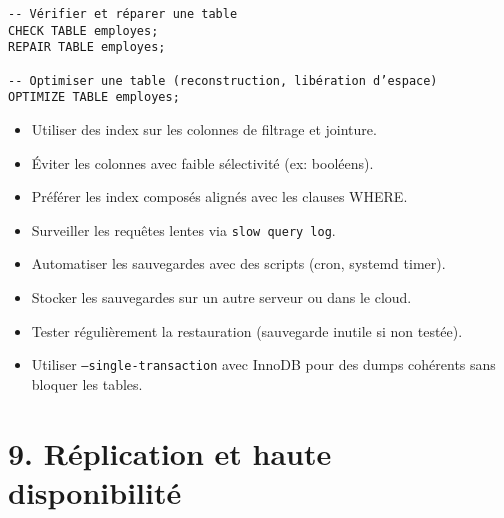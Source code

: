 \documentclass[a4paper,11pt]{article}
\begin{document}
\begin{tcolorbox}[colback=orange!5!white,colframe=orange!75!black,title=Analyse et optimisation des tables]
\begin{verbatim}
-- Vérifier et réparer une table
CHECK TABLE employes;
REPAIR TABLE employes;

-- Optimiser une table (reconstruction, libération d’espace)
OPTIMIZE TABLE employes;
\end{verbatim}
\end{tcolorbox}

\begin{tcolorbox}[colback=purple!5!white,colframe=purple!75!black,title=Index et performance]
\begin{itemize}
  \item Utiliser des index sur les colonnes de filtrage et jointure.
  \item Éviter les colonnes avec faible sélectivité (ex: booléens).
  \item Préférer les index composés alignés avec les clauses WHERE.
  \item Surveiller les requêtes lentes via \texttt{slow query log}.
\end{itemize}
\end{tcolorbox}

\begin{tcolorbox}[colback=red!5!white,colframe=red!75!black,title=Bonnes pratiques de sauvegarde]
\begin{itemize}
  \item Automatiser les sauvegardes avec des scripts (cron, systemd timer).
  \item Stocker les sauvegardes sur un autre serveur ou dans le cloud.
  \item Tester régulièrement la restauration (sauvegarde inutile si non testée).
  \item Utiliser \texttt{--single-transaction} avec InnoDB pour des dumps cohérents sans bloquer les tables.
\end{itemize}
\end{tcolorbox}


\section*{9. Réplication et haute disponibilité}
\end{document}
